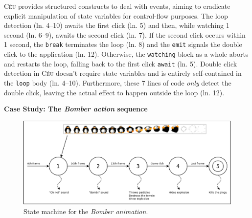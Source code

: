 \documentclass{vgtc}                          %
\newcommand{\CEU}{\textsc{C\'{e}u}\xspace}
\newcommand{\code}[1] {{\small{\texttt{#1}}}}
\begin{document}
\CEU provides structured constructs to deal with events, aiming to eradicate
explicit manipulation of state variables for control-flow purposes.
%
The loop detection (ln. 4--10) awaits the first click (ln. 5) and then, while
watching 1 second (ln. 6--9), awaits the second click (ln. 7).
If the second click occurs within 1 second, the \code{break} terminates the
loop (ln. 8) and the \code{emit} signals the double click to the application
(ln. 12).
Otherwise, the \code{watching} block as a whole aborts and restarts the loop, 
falling back to the first click \code{await} (ln. 5).
%
Double click detection in \CEU doesn't require state variables and is entirely
self-contained in the \code{loop} body (ln. 4--10).
Furthermore, these 7 lines of code \emph{only} detect the double click, leaving
the actual effect to happen outside the loop (ln. 12).

\textbf{Case Study: The \emph{Bomber action} sequence}


\begin{figure}[t]
\centering
\includegraphics[width=\columnwidth]{bomber-state}
\caption{ State machine for the \emph{Bomber animation}.
\label{fig.bomber}
}
\end{figure}
\end{document}
